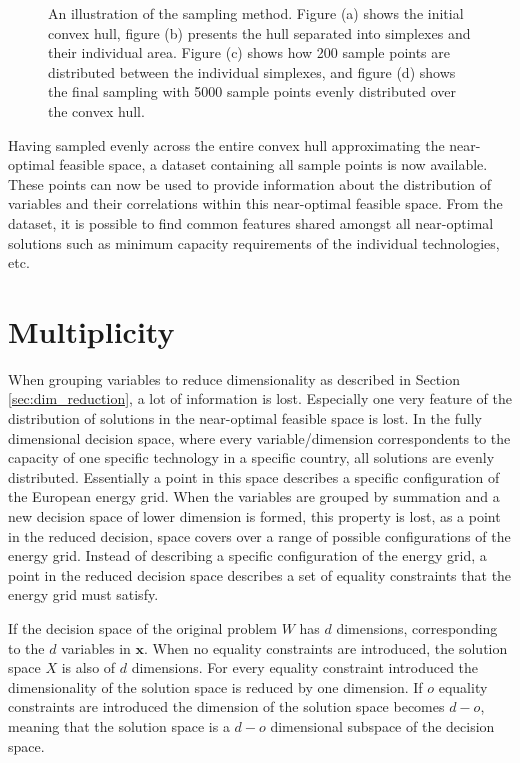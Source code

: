 \begin{figure}[h]
\begin{subfigure}{.45\textwidth}
		\caption{}
		\label{fig:sampling_4}
	\end{subfigure}
	\caption{An illustration of the sampling method. Figure (a)  shows the initial convex hull, figure (b) presents the hull separated into simplexes and their individual area. Figure (c) shows how 200 sample points are distributed between the individual simplexes, and figure (d) shows the final sampling with 5000 sample points evenly distributed over the convex hull.}
\end{figure}


Having sampled evenly across the entire convex hull approximating the near-optimal feasible space, a dataset containing all sample points is now available. These points can now be used to provide information about the distribution of variables and their correlations within this near-optimal feasible space. From the dataset, it is possible to find common features shared amongst all near-optimal solutions such as minimum capacity requirements of the individual technologies, etc. 


\section{Multiplicity }\label{sec:Multiplicity}

When grouping variables to reduce dimensionality as described in Section \ref{sec:dim_reduction}, a lot of information is lost. Especially one very feature of the distribution of solutions in the near-optimal feasible space is lost. In the fully dimensional decision space, where every variable/dimension correspondents to the capacity of one specific technology in a specific country, all solutions are evenly distributed. Essentially a point in this space describes a specific configuration of the European energy grid. 
When the variables are grouped by summation and a new decision space of lower dimension is formed, this property is lost, as a point in the reduced decision, space covers over a range of possible configurations of the energy grid. Instead of describing a specific configuration of the energy grid, a point in the reduced decision space describes a set of equality constraints that the energy grid must satisfy. 

If the decision space of the original problem $W$ has $d$ dimensions, corresponding to the $d$ variables in $\mathbf{x}$. When no equality constraints are introduced, the solution space $X$ is also of $d$ dimensions. For every equality constraint introduced the dimensionality of the solution space is reduced by one dimension. If $o$ equality constraints are introduced the dimension of the solution space becomes $d-o$, meaning that the solution space is a $d-o$ dimensional subspace of the decision space. 

